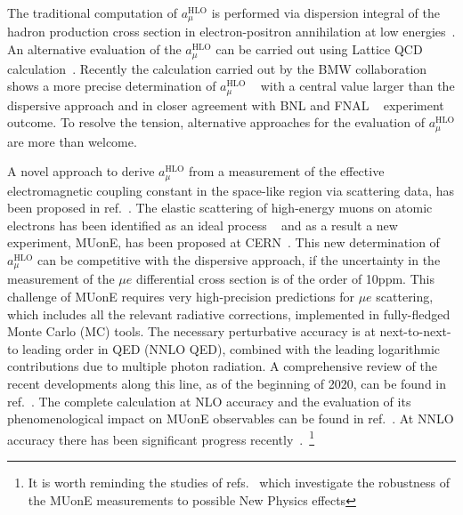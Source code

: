\documentclass[Physsubmission, Phys]{SciPost}
\begin{document}
The traditional computation of $a_\mu^\text{HLO}$ is performed via dispersion
integral of the hadron production cross section in electron-positron
annihilation at low
energies~\cite{Jegerlehner:2018zrj,Keshavarzi:2018mgv,Davier:2019can,Aoyama:2020ynm}. An alternative evaluation of the $a_\mu^\text{HLO}$ can be carried out using Lattice QCD calculation~\cite{DellaMorte:2017dyu,Chakraborty:2017tqp,Borsanyi:2017zdw,Meyer:2018til,Blum:2018mom,Giusti:2018mdh,Giusti:2019xct,Giusti:2019hkz,Shintani:2019wai,Davies:2019efs,Gerardin:2019rua,Aubin:2019usy,Giusti:2020efo,Lehner:2020crt}. Recently the calculation carried out by the BMW collaboration shows a more precise determination of $a_\mu^\text{HLO}$ ~\cite{Borsanyi:2020mff} with a central value larger than the dispersive approach and in closer agreement with BNL and FNAL ~\cite{Bennett:2006fi,Abi:2021gix} experiment outcome. To
resolve the tension, alternative approaches for the evaluation of $a_\mu^\text{HLO}$ are more than welcome.

A novel approach to derive $a_\mu^\text{HLO}$ from a measurement of the effective
electromagnetic coupling constant in the space-like region via
scattering data, has been proposed in ref.~\cite{Calame:2015fva}.
The elastic scattering of high-energy muons on atomic electrons has been
identified as an ideal process ~\cite{Abbiendi:2016xup}
and as a result a new experiment, MUonE, has been proposed at CERN~\cite{MUonE:LoI,Abbiendi:2019qtw,Ballerini:2019zkk,Abbiendi:2021xsh}.
This new determination of $a_\mu^\text{HLO}$ can be
competitive with the dispersive approach, if the uncertainty
in the measurement of the $\mu e$ differential cross section is
of the order of 10ppm. This challenge of MUonE requires very high-precision
predictions for $\mu e$ scattering, which includes all the relevant
radiative corrections, implemented in fully-fledged Monte Carlo (MC)
tools. The necessary perturbative accuracy is at next-to-next-to
leading order in QED (NNLO QED), combined with the leading logarithmic contributions due to multiple
photon radiation. A comprehensive review of the recent developments along this line, as of the beginning of 2020, can be found in
ref.~\cite{Banerjee:2020tdt}. The complete calculation at NLO accuracy and the
        evaluation of its phenomenological impact on MUonE observables
        can be found in
ref.~\cite{Alacevich:2018vez}. At NNLO accuracy there has been significant progress recently~\cite{Mastrolia:2017pfy,DiVita:2018nnh,Engel:2018fsb,Engel:2019nfw,CarloniCalame:2020yoz,Banerjee:2020rww,Bonciani:2021okt,Fael:2018dmz,Fael:2019nsf,Heller:2021gun,Budassi:2021twh}.~\footnote{It is worth reminding the studies of refs.~\cite{Dev:2020drf,Masiero:2020vxk}
        which investigate the robustness of the MUonE measurements
        to possible New Physics effects}
\end{document}

